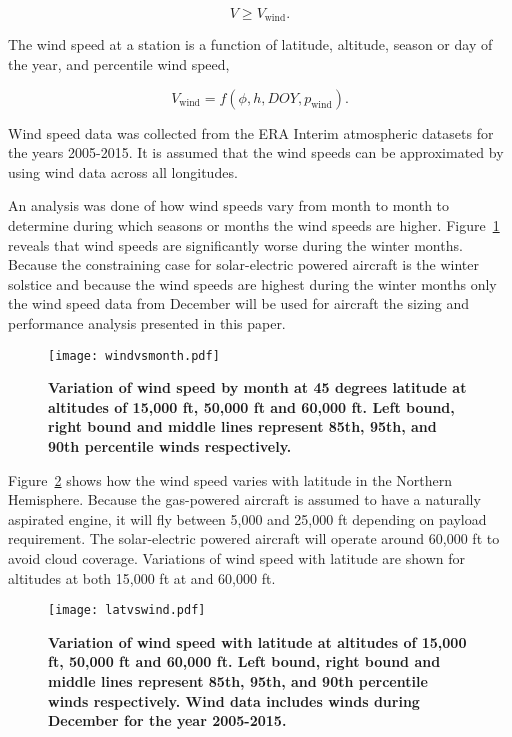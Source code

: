 \documentclass[]{aiaa-tc}%
\begin{document}
\begin{equation}
    \label{e:availreq}
    V \geq V_{\text{wind}}.
\end{equation}

The wind speed at a station is a function of latitude, altitude, season or day of the year, and percentile wind speed,

\begin{equation}
    \label{e:windspeed}
    V_{\text{wind}} = f(\phi, h, DOY, p_{\text{wind}}).
    \end{equation}

Wind speed data was collected from the ERA Interim atmospheric datasets for the years 2005-2015.\cite{wind} 
It is assumed that the wind speeds can be approximated by using wind data across all longitudes. 

An analysis was done of how wind speeds vary from month to month to determine during which seasons or months the wind speeds are higher. Figure~\ref{f:windvsmonth} reveals that wind speeds are significantly worse during the winter months. 
Because the constraining case for solar-electric powered aircraft is the winter solstice and because the wind speeds are highest during the winter months only the wind speed data from December will be used for aircraft the sizing and performance analysis presented in this paper. 

\begin{figure}[H]
	\begin{center}
	\texttt{[image: windvsmonth.pdf]}
    \caption{ \textbf{ Variation of wind speed by month at 45 degrees latitude at altitudes of 15,000 ft, 50,000 ft and 60,000 ft.  Left bound, right bound and middle lines represent 85th, 95th, and 90th percentile winds respectively. }}
	\label{f:windvsmonth}
	\end{center}
\end{figure}

Figure~\ref{f:latvswind} shows how the wind speed varies with latitude in the Northern Hemisphere. 
Because the gas-powered aircraft is assumed to have a naturally aspirated engine, it will fly between 5,000 and 25,000 ft depending on payload requirement. 
The solar-electric powered aircraft will operate around 60,000 ft to avoid cloud coverage.  
Variations of wind speed with latitude are shown for altitudes at both 15,000 ft at and 60,000 ft.  \\

\begin{figure}[H]
	\begin{center}
	\texttt{[image: latvswind.pdf]}
    \caption{ \textbf{ Variation of wind speed with latitude at altitudes of 15,000 ft, 50,000 ft and 60,000 ft.  Left bound, right bound and middle lines represent 85th, 95th, and 90th percentile winds respectively. Wind data includes winds during December for the year 2005-2015.}}
	\label{f:latvswind}
	\end{center}
\end{figure}
\end{document}
